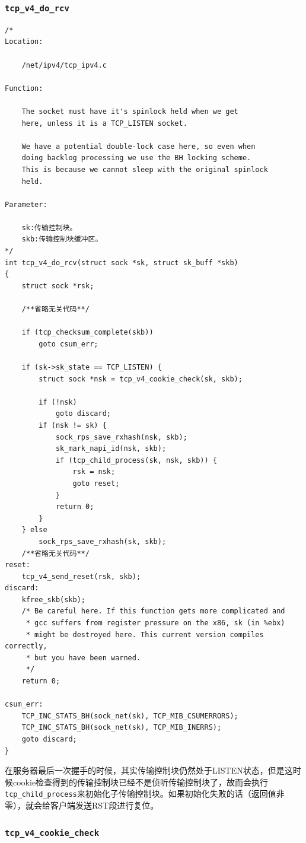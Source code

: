 			\subsubsection{\texttt{tcp_v4_do_rcv}}
\begin{verbatim}
/* 
Location:

	/net/ipv4/tcp_ipv4.c

Function:

	The socket must have it's spinlock held when we get
	here, unless it is a TCP_LISTEN socket.

	We have a potential double-lock case here, so even when
	doing backlog processing we use the BH locking scheme.
	This is because we cannot sleep with the original spinlock
	held.

Parameter:

	sk:传输控制块。
	skb:传输控制块缓冲区。
*/
int tcp_v4_do_rcv(struct sock *sk, struct sk_buff *skb)
{
    struct sock *rsk;

    /**省略无关代码**/

    if (tcp_checksum_complete(skb))
        goto csum_err;

    if (sk->sk_state == TCP_LISTEN) {
        struct sock *nsk = tcp_v4_cookie_check(sk, skb);

        if (!nsk)
            goto discard;
        if (nsk != sk) {
            sock_rps_save_rxhash(nsk, skb);
            sk_mark_napi_id(nsk, skb);
            if (tcp_child_process(sk, nsk, skb)) {
                rsk = nsk;
                goto reset;
            }
            return 0;
        }
    } else
        sock_rps_save_rxhash(sk, skb);
    /**省略无关代码**/
reset:
    tcp_v4_send_reset(rsk, skb);
discard:
    kfree_skb(skb);
    /* Be careful here. If this function gets more complicated and
     * gcc suffers from register pressure on the x86, sk (in %ebx)
     * might be destroyed here. This current version compiles correctly,
     * but you have been warned.
     */
    return 0;

csum_err:
    TCP_INC_STATS_BH(sock_net(sk), TCP_MIB_CSUMERRORS);
    TCP_INC_STATS_BH(sock_net(sk), TCP_MIB_INERRS);
    goto discard;
}
\end{verbatim}
                    在服务器最后一次握手的时候，其实传输控制块仍然处于LISTEN状态，但是这时候cookie检查得到的传输控制块已经不是侦听传输控制块了，故而会执行\texttt{tcp_child_process}来初始化子传输控制块。如果初始化失败的话（返回值非零），就会给客户端发送RST段进行复位。

                \subsubsection{\texttt{tcp_v4_cookie_check}}

